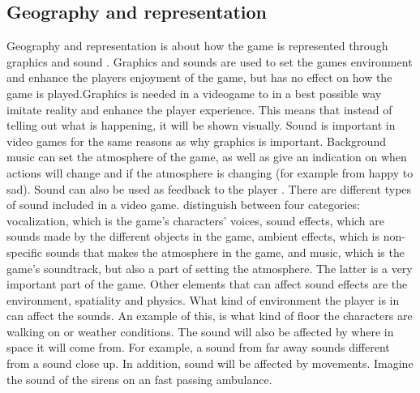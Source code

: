 \subsection{Geography and representation}
Geography and representation is about how the game is represented through graphics and sound \cite{understandingvg}. Graphics and sounds are used to set the games environment and enhance the players enjoyment of the game, but has no effect on how the game is played.Graphics is needed in a videogame to in a best possible way imitate reality and enhance the player experience. This means that instead of telling out what is happening, it will be shown visually. Sound is important in video games for the same reasons as why graphics is important. Background music can set the atmosphere of the game, as well as give an indication on when actions will change and if the atmosphere is changing (for example from happy to sad). Sound can also be used as feedback to the player \cite{umlapproach}. There are different types of sound included in a  video game. \cite{understandingvg} distinguish between four categories:
vocalization, which is the game’s characters’ voices,
sound effects, which are sounds made by the different objects in the game, ambient effects, which is non-specific sounds that makes the atmosphere in the game, and music, which is the game’s soundtrack, but also a part of setting the atmosphere. The latter is a very important part of the game. Other elements that can affect sound effects are the environment, spatiality and physics. What kind of environment the player is in can affect the  sounds. An example of this, is what kind of floor the characters are walking on or weather conditions. The sound will also be affected by where in space it will come from. For example, a sound from far away sounds different from a sound close up. In addition, sound will be affected by movements. Imagine the sound of the sirens on an fast passing ambulance.

